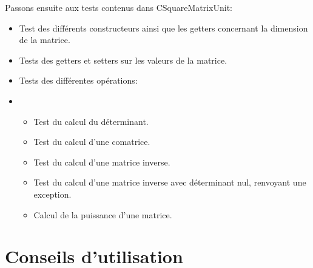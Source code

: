 		Passons ensuite aux tests contenus dans CSquareMatrixUnit:
		\begin{itemize}
			\item Test des différents constructeurs ainsi que les getters concernant la dimension de la matrice.
			\item Tests des getters et setters sur les valeurs de la matrice.
			\item Tests des différentes opérations:
			\item 
			\begin{itemize}
				\item Test du calcul du déterminant.
				\item Test du calcul d'une comatrice.
				\item Test du calcul d'une matrice inverse.
				\item Test du calcul d'une matrice inverse avec déterminant nul, renvoyant une exception.
				\item Calcul de la puissance d'une matrice.
			\end{itemize}
		\end{itemize}
	
	\chapter{Conseils d'utilisation}


